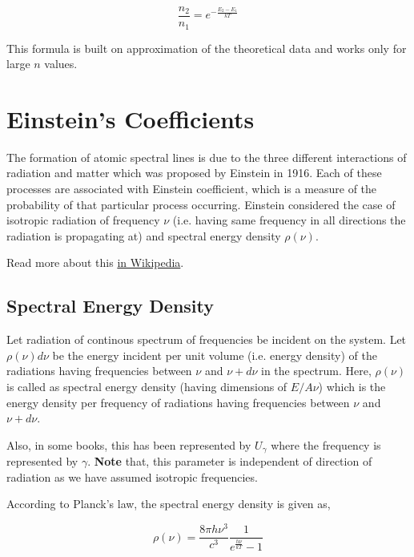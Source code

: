 \documentclass[12pt]{article}
\begin{document}
\begin{equation}
    \frac{n_{2}}{n_{1}} = e^{-\frac{E_{2} - E_{1}}{kT}}
\end{equation}

This formula is built on approximation of the theoretical data and works only for large $n$ values.

\section{Einstein's Coefficients}

The formation of atomic spectral lines is due to the three different interactions of radiation and matter which was proposed by Einstein in 1916. Each of these processes are associated with Einstein coefficient, which is a measure of the probability of that particular process occurring. Einstein considered the case of isotropic radiation of frequency $\nu$ (i.e. having same frequency in all directions the radiation is propagating at) and spectral energy density $\rho(\nu)$. \vspace{.2cm}

Read more about this \href{https://en.wikipedia.org/wiki/Einstein_coefficients}{in Wikipedia}.

\subsection{Spectral Energy Density}

Let radiation of continous spectrum of frequencies be incident on the system. Let $\rho(\nu)d\nu$ be the energy incident per unit volume (i.e. energy density) of the radiations having frequencies between $\nu$ and $\nu + d\nu$ in the spectrum. Here, $\rho(\nu)$ is called as spectral energy density (having dimensions of $E/A\nu$) which is the energy density per frequency of radiations having frequencies between $\nu$ and $\nu + d\nu$.

Also, in some books, this has been represented by $U_{\gamma}$ where the frequency is represented by $\gamma$. \textbf{Note} that, this parameter is independent of direction of radiation as we have assumed isotropic frequencies. \vspace{.2cm}

According to Planck's law, the spectral energy density is given as,

\begin{equation}
    \rho(\nu) = \frac{8\pi h\nu^3}{c^3} \frac{1}{e^\frac{h\nu}{kT} - 1}
\end{equation}
\end{document}
